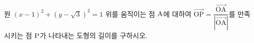 원 $(x-1)^2+(y-\sqrt{3})^2=1$ 위를 움직이는 점 $\mathrm{A}$에 대하여 $\overrightarrow{\mathrm{OP}}=\dfrac{\overrightarrow{\mathrm{OA}}}{|\overrightarrow{\mathrm{OA}}|}$를 만족시키는 점 $\mathrm{P}$가 나타내는 도형의 길이를 구하시오. 
